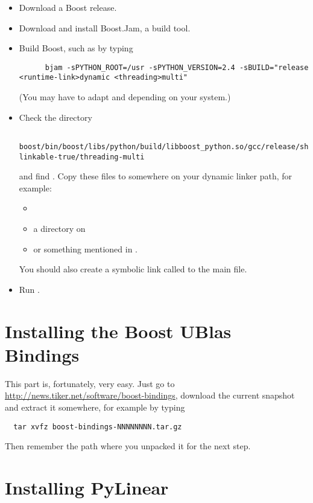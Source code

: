 \begin{itemize}
  \item Download a Boost release.
  \item Download and install Boost.Jam, a build tool.
  \item Build Boost, such as by typing
    \begin{verbatim}
      bjam -sPYTHON_ROOT=/usr -sPYTHON_VERSION=2.4 -sBUILD="release <runtime-link>dynamic <threading>multi"
    \end{verbatim}

    (You may have to adapt  and
     depending on your system.)
  \item Check the directory 
    \begin{verbatim}
      boost/bin/boost/libs/python/build/libboost_python.so/gcc/release/shared-linkable-true/threading-multi
    \end{verbatim}
    and find . Copy these files to somewhere
    on your dynamic linker path, for example:
    \begin{itemize}
    \item {}
    \item a directory on 
    \item or something mentioned in .
    \end{itemize}
    You should also create a symbolic link called 
    to the main  file.

  \item Run .
\end{itemize}

\section{Installing the Boost UBlas Bindings}

\label{sec:install-bindings}
This part is, fortunately, very easy. Just go to \url{http://news.tiker.net/software/boost-bindings},
download the current snapshot and extract it somewhere, for example by typing
\begin{verbatim}
  tar xvfz boost-bindings-NNNNNNNN.tar.gz
\end{verbatim}
Then remember the path where you unpacked it for the next step.

\section{Installing PyLinear}


